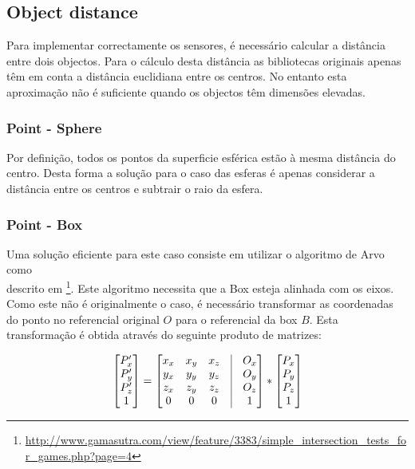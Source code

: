 \documentclass[a4paper]{article}
\begin{document}
\subsection{Object distance}
\indent \indent Para implementar correctamente os sensores, é necessário calcular a distância entre dois objectos.
Para o cálculo desta distância as bibliotecas originais apenas têm em conta a distância euclidiana entre os centros.
No entanto esta aproximação não é suficiente quando os objectos têm dimensões elevadas.

\subsubsection{Point - Sphere}
\indent \indent Por definição, todos os pontos da superficie esférica estão à mesma distância do centro.
Desta forma a solução para o caso das esferas é apenas considerar a distância entre os centros e subtrair o raio da esfera.

\subsubsection{Point - Box}
\indent \indent Uma solução eficiente para este caso consiste em utilizar o algoritmo de Arvo como \\ descrito em  \footnote[1]{\url{http://www.gamasutra.com/view/feature/3383/simple_intersection_tests_for_games.php?page=4}}.
Este algoritmo necessita que a Box esteja alinhada com os eixos. Como este não é originalmente o caso, é necessário transformar as coordenadas do ponto no referencial original $O$ para o referencial da box $B$.
Esta transformação é obtida através do seguinte produto de matrizes:

\[
 	\begin{bmatrix}
		P_{x}' \\
		P_{y}' \\
		P_{z}' \\
		1 
	\end{bmatrix}
	=
	\begin{bmatrix}
		x_{x} & x_{y} & x_{z} & \vline & O_{x}	\\
		y_{x} & y_{y} & y_{z} & \vline & O_{y}	\\
		z_{x} & z_{y} & z_{z} & \vline & O_{z}	\\
		0 & 0 & 0 & \vline & 1 	\\
	\end{bmatrix}
	*
 	\begin{bmatrix}
		P_{x} \\
		P_{y} \\
		P_{z} \\
		1 
	\end{bmatrix}
\]
\end{document}
